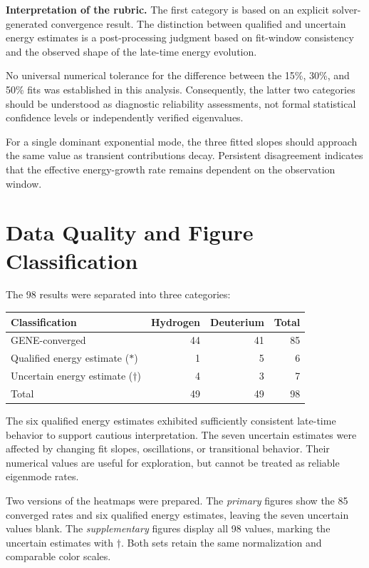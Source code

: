 \documentclass[10pt,letterpaper]{article}
\begin{document}
\textbf{Interpretation of the rubric.}
The first category is based on an explicit
solver-generated convergence result.
The distinction between qualified and uncertain
energy estimates is a post-processing judgment
based on fit-window consistency and the observed
shape of the late-time energy evolution.

No universal numerical tolerance for the
difference between the 15\%, 30\%, and 50\%
fits was established in this analysis.
Consequently, the latter two categories
should be understood as diagnostic reliability
assessments, not formal statistical confidence
levels or independently verified eigenvalues.

For a single dominant exponential mode,
the three fitted slopes should approach
the same value as transient contributions decay.
Persistent disagreement indicates that the
effective energy-growth rate remains dependent
on the observation window.

\section{Data Quality and Figure Classification}

The 98 results were separated into three categories:

\begin{center}
\begin{tabular}{lrrr}
\toprule
Classification & Hydrogen & Deuterium & Total\\
\midrule
GENE-converged & 44 & 41 & 85\\
Qualified energy estimate ($*$) & 1 & 5 & 6\\
Uncertain energy estimate ($\dagger$) & 4 & 3 & 7\\
\midrule
Total & 49 & 49 & 98\\
\bottomrule
\end{tabular}
\end{center}

The six qualified energy estimates exhibited
sufficiently consistent late-time behavior to
support cautious interpretation. The seven
uncertain estimates were affected by changing
fit slopes, oscillations, or transitional behavior.
Their numerical values are useful for exploration,
but cannot be treated as reliable eigenmode rates.

Two versions of the heatmaps were prepared.
The \emph{primary} figures show the 85 converged
rates and six qualified energy estimates, leaving
the seven uncertain values blank. The
\emph{supplementary} figures display all 98 values,
marking the uncertain estimates with $\dagger$.
Both sets retain the same normalization and
comparable color scales.
\end{document}
